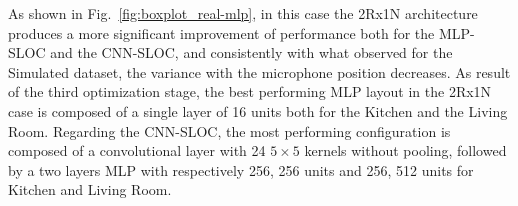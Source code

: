 \documentclass[review]{elsarticle}
\newcommand{\figref}[1]{Fig.~\ref{#1}}
\begin{document}
As shown in \figref{fig:boxplot_real-mlp}, in this case the 2Rx1N architecture produces a more significant improvement of performance both for the MLP-SLOC and the CNN-SLOC, and consistently with what observed for the Simulated dataset, the variance with the microphone position decreases.
As result of the third optimization stage, the best performing MLP layout in the 2Rx1N case is composed of a single layer of 16 units  both for the Kitchen and the Living Room. Regarding the CNN-SLOC,  the most performing configuration is composed of a convolutional layer with 24 $5\times5$ kernels without pooling, followed by a two layers MLP with respectively 256, 256 units and 256, 512 units for Kitchen and Living Room.

\begin{table}[t]
	\centering
	\caption{Results for Convolutional Neural Networks with the best performing configurations in the Real case study.}
	\label{tab:bestCONF_REAL}
\end{table}
\end{document}
